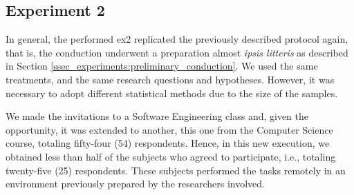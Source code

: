 \subsection{Experiment 2}
\label{ssec_experiments:Experiment2}

In general, the performed \ac{ex2} replicated the previously described protocol again, that is, the conduction underwent a preparation almost \textit{ipsis litteris} as described in Section \ref{ssec_experiments:preliminary_conduction}.
We used the same treatments, and the same research questions and hypotheses.
However, it was necessary to adopt different statistical methods due to the size of the samples.

We made the invitations to a Software Engineering class and, given the opportunity, it was extended to another, this one from the Computer Science course, totaling fifty-four (54) respondents.
Hence, in this new execution, we obtained less than half of the subjects who agreed to participate, i.e., totaling twenty-five (25) respondents.
These subjects performed the tasks remotely in an environment previously prepared by the researchers involved.

